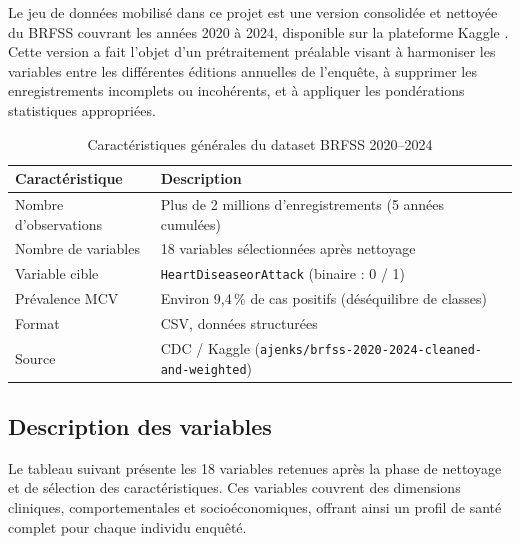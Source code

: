 \documentclass[12pt,a4paper]{report}
\begin{document}
Le jeu de données mobilisé dans ce projet est une version consolidée et nettoyée du
\acs{BRFSS} couvrant les années 2020 à 2024, disponible sur la plateforme Kaggle
\cite{brfss2024kaggle}. Cette version a fait l'objet d'un prétraitement préalable
visant à harmoniser les variables entre les différentes éditions annuelles de
l'enquête, à supprimer les enregistrements incomplets ou incohérents, et à appliquer
les pondérations statistiques appropriées.

\begin{table}[H]
\centering
\caption{Caractéristiques générales du dataset BRFSS 2020--2024}
\label{tab:caract_dataset}
\begin{tabularx}{\textwidth}{L{4.5cm} X}
\toprule
\textbf{Caractéristique} & \textbf{Description} \\
\midrule
Nombre d'observations & Plus de 2 millions d'enregistrements (5 années cumulées) \\
\addlinespace
Nombre de variables & 18 variables sélectionnées après nettoyage \\
\addlinespace
Variable cible & \texttt{HeartDiseaseorAttack} (binaire : 0 / 1) \\
\addlinespace
Prévalence MCV & Environ 9,4\,\% de cas positifs (déséquilibre de classes) \\
\addlinespace
Format & CSV, données structurées \\
\addlinespace
Source & CDC / Kaggle (\texttt{ajenks/brfss-2020-2024-cleaned-and-weighted}) \\
\bottomrule
\end{tabularx}
\end{table}

\subsection{Description des variables}

Le tableau suivant présente les 18 variables retenues après la phase de nettoyage et
de sélection des caractéristiques. Ces variables couvrent des dimensions cliniques,
comportementales et socioéconomiques, offrant ainsi un profil de santé complet pour
chaque individu enquêté.
\end{document}
